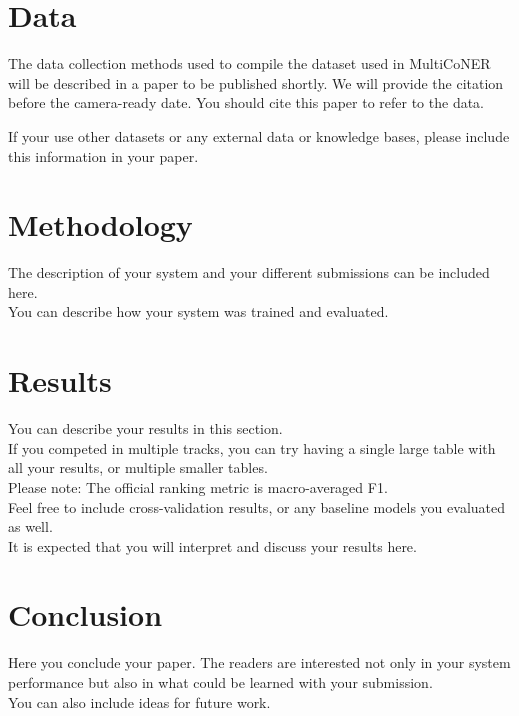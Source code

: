 \documentclass[11pt]{article}
\begin{document}
\section{Data}


The data collection methods used to compile the dataset used in MultiCoNER will be described in a paper to be published shortly. We will provide the citation before the camera-ready date.
You should cite this paper to refer to the data.

If your use other datasets or any external data or knowledge bases, please include this information in your paper. 

\section{Methodology}
The description of your system and your different submissions can be included here.\\

You can describe how your system was trained and evaluated.


\section{Results}
\label{sec:results}

You can describe your results in this section. \\


If you competed in multiple tracks, you can try having a single large table with all your results, or multiple smaller tables.\\

Please note: The official ranking metric is macro-averaged F1.\\


Feel free to include cross-validation results, or any baseline models you evaluated as well.\\

It is expected that you will interpret and discuss your results here.

\section{Conclusion}

Here you conclude your paper. The readers are interested not only in your system performance but also in what could be learned with your submission.\\

You can also include ideas for future work.






\end{document}
